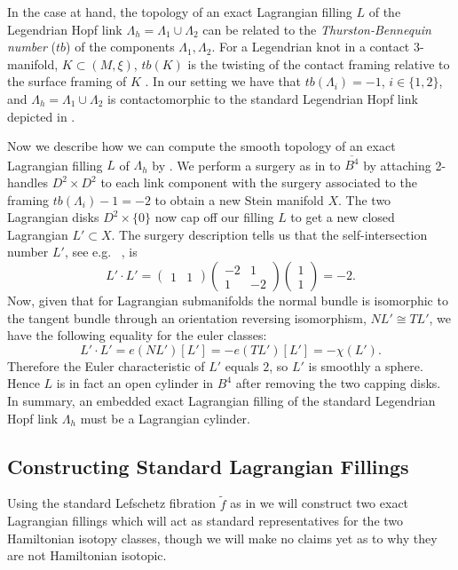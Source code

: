 \documentclass[10pt]{amsart}
\theoremstyle{plain}
\theoremstyle{definition}
\numberwithin{equation}{section}
\newcommand{\La}{\Lambda}
\newcommand{\sse}{\subset}
\begin{document}
In the case at hand, the topology of an exact Lagrangian filling $L$ of the Legendrian Hopf link $\Lambda_h = \Lambda_1 \cup \Lambda_2$ can be related to the \textit{Thurston-Bennequin number} ($tb$) of the components $\Lambda_1,\Lambda_2$. For a Legendrian knot in a contact $3$-manifold, $K\sse (M,\xi)$, $tb(K)$ is the twisting of the contact framing relative to the surface framing of $K$ \cite[Section 3.5]{Geiges08_IntroContact}. In our setting we have that $tb(\Lambda_i)=-1$, $i\in\{1,2\}$, and $\La_h=\La_1\cup \La_2$ is contactomorphic to the standard Legendrian Hopf link depicted in .

Now we describe how we can compute the smooth topology of an exact Lagrangian filling $L$ of $\La_h$ by \cite[Theorem 1.4]{Chantraine10_LagrConcordance}. We perform a surgery as in \cite{Gompf98_HandlebodyStein} to $\overline{B^4}$ by attaching 2-handles $D^2\times D^2$ to each link component with the surgery associated to the framing $tb(\Lambda_i)-1=-2$ to obtain a new Stein manifold $X$. The two Lagrangian disks $D^2\times \{0\}$ now cap off our filling $L$ to get a new closed Lagrangian $L'\sse X$. The surgery description tells us that the self-intersection number $L'$, see e.g. ~\cite[Proposition 4.5.11]{GompfStipsicz99_KirbyCalc}, is
$$L'\cdot L' = \begin{pmatrix}1&1\end{pmatrix}\begin{pmatrix}-2&1\\
1&-2\end{pmatrix}\begin{pmatrix}1\\
1\end{pmatrix} = -2.$$
Now, given that for Lagrangian submanifolds the normal bundle is isomorphic to the tangent bundle through an orientation reversing isomorphism, $NL'\cong TL'$, we have the following equality for the euler classes:
$$L'\cdot L' = e(NL')[L'] = -e(TL')[L'] = -\chi (L').$$
Therefore the Euler characteristic of $L'$ equals $2$, so $L'$ is smoothly a sphere. Hence $L$ is in fact an open cylinder in $B^4$ after removing the two capping disks. In summary, an embedded exact Lagrangian filling of the standard Legendrian Hopf link $\La_h$ must be a Lagrangian cylinder.

\subsection{Constructing Standard Lagrangian Fillings}\label{sec:std_fillings}
Using the standard Lefschetz fibration $\tilde{f}$ as in  we will construct two exact Lagrangian fillings which will act as standard representatives for the two Hamiltonian isotopy classes, though we will make no claims yet as to why they are not Hamiltonian isotopic.
\end{document}
